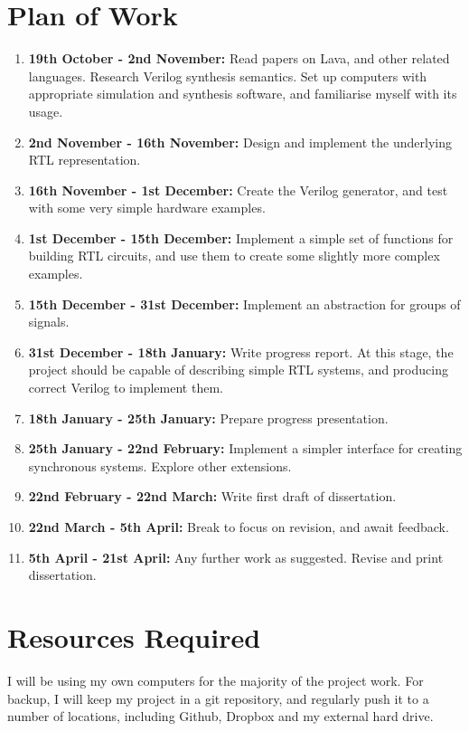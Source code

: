 \section*{Plan of Work}

\begin{enumerate}

\item
{\bf 19th October - 2nd November: }
Read papers on Lava, and other related languages. Research 
Verilog synthesis semantics. Set up computers with 
appropriate simulation and synthesis software, and 
familiarise myself with its usage.

\item
{\bf 2nd November - 16th November: }
Design and implement the underlying RTL representation.

\item
{\bf 16th November - 1st December: }
Create the Verilog generator, and test with some very simple 
hardware examples.

\item
{\bf 1st December - 15th December:}
Implement a simple set of functions for building RTL 
circuits, and use them to create some slightly more complex 
examples.

\item
{\bf 15th December - 31st December: }
Implement an abstraction for groups of signals.

\item
{\bf 31st December - 18th January:}
Write progress report. At this stage, the project should be 
capable of describing simple RTL systems, and producing 
correct Verilog to implement them.

\item
{\bf 18th January - 25th January: }
Prepare progress presentation.

\item
{\bf 25th January - 22nd February: }
Implement a simpler interface for creating synchronous 
systems. Explore other extensions.

\item
{\bf 22nd February - 22nd March: }
Write first draft of dissertation.

\item
{\bf 22nd March - 5th April:}
Break to focus on revision, and await feedback.

\item
{\bf 5th April - 21st April: }
Any further work as suggested. Revise and print 
dissertation.

\end{enumerate}

\section*{Resources Required}

I will be using my own computers for the majority of the 
project work. For backup, I will keep my project in a git 
repository, and regularly push it to a number of locations, 
including Github, Dropbox and my external hard drive.


